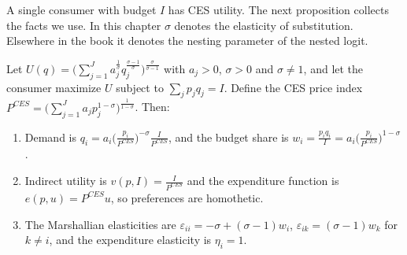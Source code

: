 A single consumer with budget $I$ has CES utility. The next proposition collects the facts we use. In this
chapter $\sigma$ denotes the elasticity of substitution. Elsewhere in the book it denotes the nesting
parameter of the nested logit.

\begin{proposition}\label{prop:05-ces}
Let $U(q) = \big(\sum_{j=1}^J a_j^{\frac{1}{\sigma}}q_j^{\frac{\sigma-1}{\sigma}}\big)^{\frac{\sigma}{\sigma-1}}$
with $a_j > 0$, $\sigma > 0$ and $\sigma \neq 1$, and let the consumer maximize $U$ subject to
$\sum_j p_jq_j = I$. Define the CES price index
$P^{CES} = \big(\sum_{j=1}^J a_jp_j^{1-\sigma}\big)^{\frac{1}{1-\sigma}}$. Then:
\begin{enumerate}[label=(\roman*)]
\item Demand is $q_i = a_i\big(\frac{p_i}{P^{CES}}\big)^{-\sigma}\frac{I}{P^{CES}}$, and the budget share is
  $w_i = \frac{p_iq_i}{I} = a_i\big(\frac{p_i}{P^{CES}}\big)^{1-\sigma}$.
\item Indirect utility is $v(p, I) = \frac{I}{P^{CES}}$ and the expenditure function is $e(p, u) = P^{CES}u$,
  so preferences are homothetic.
\item The Marshallian elasticities are $\varepsilon_{ii} = -\sigma + (\sigma - 1)w_i$,
  $\varepsilon_{ik} = (\sigma - 1)w_k$ for $k \neq i$, and the expenditure elasticity is $\eta_i = 1$.
\end{enumerate}
\end{proposition}

